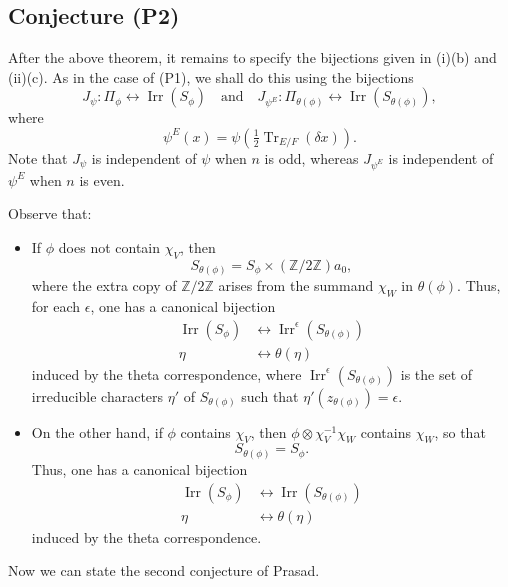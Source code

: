 \documentclass[11pt]{amsart}
\numberwithin{equation}{section}
\theoremstyle{plain}
\theoremstyle{definition}
\theoremstyle{remark}
\def\Irr{\operatorname{Irr}}
\def\Tr{\operatorname{Tr}}
\def\ZZ{\mathbb{Z}}
\begin{document}
\subsection{Conjecture (P2)} After the above theorem, it remains to specify the bijections given in (i)(b) and (ii)(c). 
As in the case of (P1), we shall do this using the bijections
 \[  J_{\psi}:  \Pi_{\phi} \longleftrightarrow \Irr(S_{\phi})   \quad \text{and} \quad J_{\psi^E}:  \Pi_{\theta(\phi)} \longleftrightarrow \Irr(S_{\theta(\phi)}), \]
where 
\[  \psi^E(x)  = \psi(\tfrac{1}{2} \Tr_{E/F}(\delta x)). \]
Note that $J_{\psi}$ is independent of $\psi$ when $n$ is odd, whereas $J_{\psi^E}$ is independent of $\psi^E$ when $n$ is even. 

Observe that:

\begin{itemize}

\item If $\phi$ does not contain $\chi_V$, then 
\[  S_{\theta(\phi)}  = S_{\phi} \times (\ZZ /2 \ZZ) a_0, \]
where the extra copy of $\ZZ/2\ZZ$ arises from the summand $\chi_W$ in $\theta(\phi)$. Thus, for each $\epsilon$, one has a canonical bijection
\begin{align*}
 \Irr(S_{\phi}) & \longleftrightarrow \Irr^{\epsilon}(S_{\theta(\phi)}) \\
 \eta & \longleftrightarrow \theta(\eta)
\end{align*}
induced by the theta correspondence, where $\Irr^{\epsilon}(S_{\theta(\phi)})$ is the set of irreducible characters $\eta'$ of $S_{\theta(\phi)}$ such that $\eta'(z_{\theta(\phi)}) = \epsilon$.

\item On the other hand, if $\phi$ contains $\chi_V$, then $\phi \otimes \chi_V^{-1} \chi_W$ contains $\chi_W$, so that
 \[
   S_{\theta(\phi)}  =  S_{\phi}. \]
Thus, one has a canonical bijection
\begin{align*}
  \Irr(S_{\phi}) & \longleftrightarrow \Irr(S_{\theta(\phi)}) \\
  \eta & \longleftrightarrow \theta(\eta)
\end{align*}
induced by the theta correspondence.

\end{itemize}

Now we can state the second conjecture of Prasad. 
\end{document}

